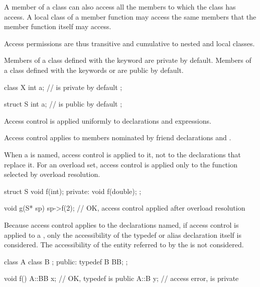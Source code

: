\pnum
A member of a class can also access all the members to which the class has access.
A local class of a member function may access
the same members that the member function itself may access.
\begin{footnote}
Access
permissions are thus transitive and cumulative to nested
and local classes.
\end{footnote}

\pnum
{}%
%
%
Members of a class defined with the keyword
are private by default.
Members of a class defined with the keywords
 or 
are public by default.
\begin{example}
\begin{codeblock}
class X {
  int a;            //  is private by default
};

struct S {
  int a;            //  is public by default
};
\end{codeblock}
\end{example}

\pnum
Access control is applied uniformly to declarations and expressions.
\begin{note}
Access control applies to members nominated by
friend declarations and
.
\end{note}
When a  is named,
access control is applied to it, not to the declarations that replace it.
For an overload set, access control is applied only to
the function selected by overload resolution.
\begin{example}
\begin{codeblock}
struct S {
  void f(int);
private:
  void f(double);
};

void g(S* sp) {
  sp->f(2);         // OK, access control applied after overload resolution
}
\end{codeblock}
\end{example}
\begin{note}
Because access control applies to the declarations named, if access control is applied to a
, only the accessibility of the typedef or alias declaration itself is considered.
The accessibility of the entity referred to by the  is not considered.
\begin{example}
\begin{codeblock}
class A {
  class B { };
public:
  typedef B BB;
};

void f() {
  A::BB x;          // OK, typedef  is public
  A::B y;           // access error,  is private
}
\end{codeblock}
\end{example}
\end{note}

